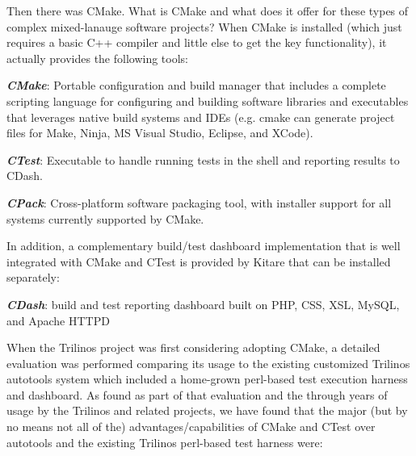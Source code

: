 \documentclass[10pt]{article}
\begin{document}
Then there was CMake.  What is CMake and what does it offer for these types of complex mixed-lanauge software projects?  When CMake is installed (which just requires a basic C++ compiler and little else to get the key functionality), it actually provides the following tools:

\begin{compactitem}
\item\textit{\textbf{CMake}}: Portable configuration and build manager that includes a complete scripting language for configuring and building software libraries and executables that leverages native build systems and IDEs (e.g. cmake can generate project files for Make, Ninja, MS Visual Studio, Eclipse, and XCode).
\item\textit{\textbf{CTest}}: Executable to handle running tests in the shell and reporting results to CDash.
\item\textit{\textbf{CPack}}: Cross-platform software packaging tool, with installer support for all systems currently supported by CMake.
\end{compactitem}

In addition, a complementary build/test dashboard implementation that is well integrated with CMake and CTest is provided by Kitare that can be installed separately:

\begin{compactitem}
\item\textit{\textbf{CDash}}: build and test reporting dashboard built on PHP, CSS, XSL, MySQL, and Apache HTTPD
\end{compactitem}

When the Trilinos project was first considering adopting CMake, a detailed evaluation was performed \cite{TrilinosCMakeEvaluation08} comparing its usage to the existing customized Trilinos autotools system which included a home-grown perl-based test execution harness and dashboard.  As found as part of that evaluation and the through years of usage by the Trilinos and related projects, we have found that the major (but by no means not all of the) advantages/capabilities of CMake and CTest over autotools and the existing Trilinos perl-based test harness were:
\end{document}
